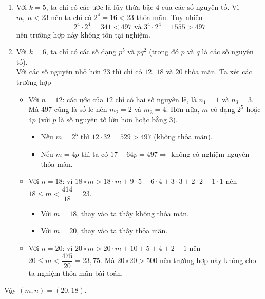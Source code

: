 \begin{ex}
{\begin{enumerate}[TH1.]
	Vì $ m_{2}n_{2}=6 $ nên $ m_{2},\ n_{2} $ nhận các giá trị trong tập $ \{2,\ 3\} $.\\
	Lại có $ m_{3},\ n_{3} $ là bình phương của $ m_{2},\ n_{2} $ tương ứng và $ 70=2\cdot 5\cdot 7 $ nên không có giá trị nào thỏa mãn.
	\item Với $ k=5 $, ta chỉ có các ước là lũy thừa bậc $ 4 $ của các số nguyên tố. Vì $ m,\ n<23 $ nên ta chỉ có $ 2^{4}=16<23 $ thỏa mãn. Tuy nhiên
	\[ 
	2^{4}\cdot 2^{4}=341<497\text{ và }3^{4}\cdot 2^{4}=1555>497
	\]
	nên trường hợp này không tồn tại nghiệm.
	\item Với $ k=6 $, ta chỉ có các số dạng $ p^{5} $ và $ pq^{2} $ (trong đó $ p $ và $ q $ là các số nguyên tố).\\
	Với các số nguyên nhỏ hơn $ 23 $ thì chỉ có $ 12,\ 18 $ và $ 20 $ thỏa mãn. Ta xét các trường hợp
	\begin{itemize}
		\item Với $ n=12 $: các ước của $ 12 $ chỉ có hai số nguyên lẻ, là $ n_{1}=1 $ và $ n_{3}=3 $. Mà $ 497 $ cũng là số lẻ nên $ m_{2}=2 $ và $ m_{3}=4 $. Hơn nữa, $ m $ có dạng $ 2^{5} $ hoặc $ 4p $ (với $ p $ là số nguyên tố lớn hơn hoặc bằng $ 3 $).
		\begin{itemize}
			\item Nếu $ m=2^{5} $ thì $ 12\cdot 32=529>497 $ (không thỏa mãn).
			\item Nếu $ m=4p $ thì ta có $ 17+64p=497\Rightarrow $ không có nghiệm nguyên thỏa mãn.
		\end{itemize}
		\item Với $ n=18 $: vì $ 18\circ m>18\cdot m+9\cdot 5+6\cdot 4+3\cdot 3+2\cdot 2+1\cdot 1 $ nên $ 18\leq m<\dfrac{414}{18}=23 $.
		\begin{itemize}
			\item Với $ m=18 $, thay vào ta thấy không thỏa mãn.
			\item Với $ m=20 $, thay vào ta thấy thỏa mãn.
		\end{itemize}
	\item Với $ n=20 $: vì $ 20\circ m>20\cdot m+10+5+4+2+1 $ nên $ 20\leq m<\dfrac{475}{20}=23,75 $. Mà $ 20\circ 20>500 $ nên trường hợp này không cho ta nghiệm thỏa mãn bài toán.
	\end{itemize}
\end{enumerate}
Vậy $ (m,n)=(20,18) $.
}
\end{ex}

